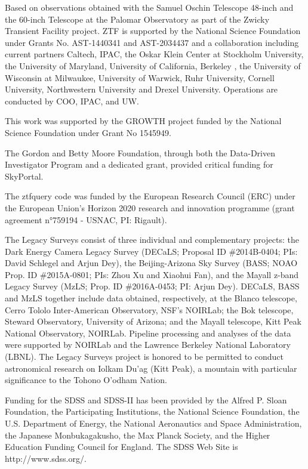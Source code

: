 \begin{acknowledgements}
Based on observations obtained with the Samuel Oschin Telescope 48-inch and the 60-inch Telescope at the Palomar Observatory as part of the Zwicky Transient Facility project. ZTF is supported by the National Science Foundation under Grants No. AST-1440341 and AST-2034437 and a collaboration including current partners Caltech, IPAC, the Oskar Klein Center at Stockholm University, the University of Maryland, University of California, Berkeley , the University of Wisconsin at Milwaukee, University of Warwick, Ruhr University, Cornell University, Northwestern University and Drexel University. Operations are conducted by COO, IPAC, and UW.

This work was supported by the GROWTH project \citep{Kasliwal2019} funded by the National Science Foundation under Grant No 1545949.

The Gordon and Betty Moore Foundation, through both the Data-Driven Investigator Program and a dedicated grant, provided critical funding for SkyPortal.

The ztfquery code was funded by the European Research Council (ERC) under the European Union's Horizon 2020 research and innovation programme (grant agreement n°759194 - USNAC, PI: Rigault).

The Legacy Surveys consist of three individual and complementary projects: the Dark Energy Camera Legacy Survey (DECaLS; Proposal ID \#2014B-0404; PIs: David Schlegel and Arjun Dey), the Beijing-Arizona Sky Survey (BASS; NOAO Prop. ID \#2015A-0801; PIs: Zhou Xu and Xiaohui Fan), and the Mayall z-band Legacy Survey (MzLS; Prop. ID \#2016A-0453; PI: Arjun Dey). DECaLS, BASS and MzLS together include data obtained, respectively, at the Blanco telescope, Cerro Tololo Inter-American Observatory, NSF’s NOIRLab; the Bok telescope, Steward Observatory, University of Arizona; and the Mayall telescope, Kitt Peak National Observatory, NOIRLab. Pipeline processing and analyses of the data were supported by NOIRLab and the Lawrence Berkeley National Laboratory (LBNL). The Legacy Surveys project is honored to be permitted to conduct astronomical research on Iolkam Du’ag (Kitt Peak), a mountain with particular significance to the Tohono O’odham Nation.

Funding for the SDSS and SDSS-II has been provided by the Alfred P. Sloan Foundation, the Participating Institutions, the National Science Foundation, the U.S. Department of Energy, the National Aeronautics and Space Administration, the Japanese Monbukagakusho, the Max Planck Society, and the Higher Education Funding Council for England. The SDSS Web Site is http://www.sdss.org/.


\end{acknowledgements}
